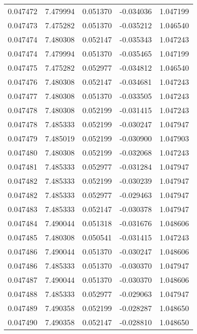 \begin{tabular}{lrrrr}
0.047472    &  7.479994 &  0.051370 & -0.034036 &             1.047199 \\
0.047473    &  7.475282 &  0.051370 & -0.035212 &             1.046540 \\
0.047474    &  7.480308 &  0.052147 & -0.035343 &             1.047243 \\
0.047474    &  7.479994 &  0.051370 & -0.035465 &             1.047199 \\
0.047475    &  7.475282 &  0.052977 & -0.034812 &             1.046540 \\
0.047476    &  7.480308 &  0.052147 & -0.034681 &             1.047243 \\
0.047477    &  7.480308 &  0.051370 & -0.033505 &             1.047243 \\
0.047478    &  7.480308 &  0.052199 & -0.031415 &             1.047243 \\
0.047478    &  7.485333 &  0.052199 & -0.030247 &             1.047947 \\
0.047479    &  7.485019 &  0.052199 & -0.030900 &             1.047903 \\
0.047480    &  7.480308 &  0.052199 & -0.032068 &             1.047243 \\
0.047481    &  7.485333 &  0.052977 & -0.031284 &             1.047947 \\
0.047482    &  7.485333 &  0.052199 & -0.030239 &             1.047947 \\
0.047482    &  7.485333 &  0.052977 & -0.029463 &             1.047947 \\
0.047483    &  7.485333 &  0.052147 & -0.030378 &             1.047947 \\
0.047484    &  7.490044 &  0.051318 & -0.031676 &             1.048606 \\
0.047485    &  7.480308 &  0.050541 & -0.031415 &             1.047243 \\
0.047486    &  7.490044 &  0.051370 & -0.030247 &             1.048606 \\
0.047486    &  7.485333 &  0.051370 & -0.030370 &             1.047947 \\
0.047487    &  7.490044 &  0.051370 & -0.030370 &             1.048606 \\
0.047488    &  7.485333 &  0.052977 & -0.029063 &             1.047947 \\
0.047489    &  7.490358 &  0.052199 & -0.028287 &             1.048650 \\
0.047490    &  7.490358 &  0.052147 & -0.028810 &             1.048650 \\

\end{tabular}
